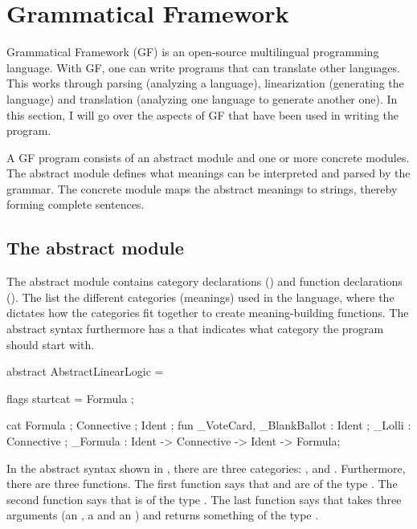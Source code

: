 \section{Grammatical Framework}
\label{03_02}


Grammatical Framework (GF) is an open-source multilingual programming language. With GF, one can write programs that can translate other languages. This works through parsing (analyzing a language), linearization (generating the language) and translation (analyzing one language to generate another one). In this section, I will go over the aspects of GF that have been used in writing the program.

A GF program consists of an abstract module and one or more concrete modules. The abstract module defines what meanings can be interpreted and parsed by the grammar. The concrete module maps the abstract meanings to strings, thereby forming complete sentences.

\subsection{The abstract module}
\label{03_02_01}

The abstract module contains category declarations () and function declarations (). The  list the different categories (meanings) used in the language, where the  dictates how the categories fit together to create meaning-building functions. The abstract syntax furthermore has a  that indicates what category the program should start with. 

\begin{lstgf}
abstract AbstractLinearLogic = {
    flags startcat = Formula ;
    
    cat 
        Formula ; Connective ; Ident ;
    fun 
        _VoteCard, _BlankBallot : Ident ;
        _Lolli : Connective ;
        _Formula : Ident -> Connective -> Ident -> Formula;
}
\end{lstgf}

In the abstract syntax shown in , there are three categories: ,  and . Furthermore, there are three functions. The first function says that  and  are of the type . The second function says that  is of the type . The last function says that  takes three arguments (an , a  and an ) and returns something of the type .

